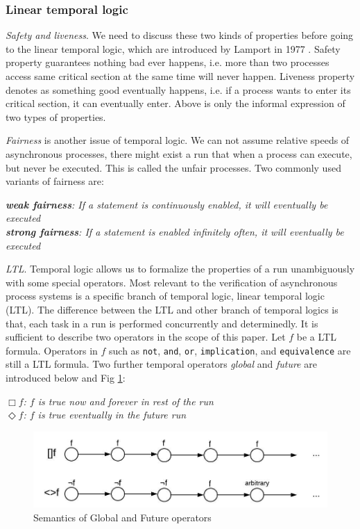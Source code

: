 \subsubsection{Linear temporal logic}
\textit{Safety and liveness}. We need to discuss these two kinds of properties before going to the linear temporal logic, which are introduced by Lamport in 1977 \cite{Lamport:1977:PCM:1313313.1313439}. Safety property guarantees nothing bad ever happens, i.e. more than two processes access same critical section at the same time will never happen. Liveness property denotes as something good eventually happens, i.e. if a process wants to enter its critical section, it can eventually enter. Above is only the informal expression of two types of properties.

\textit{Fairness} is another issue of temporal logic. We can not assume relative speeds of asynchronous processes, there might exist a run that when a process can execute, but never be executed. This is called the unfair processes. Two commonly used variants of fairness are:

{\medbreak\indent\textit{\textbf{weak fairness}: If a statement is continuously enabled, it will eventually be executed}}
{\\\indent\textit{\textbf{strong fairness}: If a statement is enabled infinitely often, it will eventually be executed}}
\medbreak

\textit{LTL}. Temporal logic allows us to formalize the properties of a run unambiguously with some special operators. Most relevant to the verification of asynchronous process systems is a specific branch of temporal logic, linear temporal logic (LTL). The difference between the LTL and other branch of temporal logics is that, each task in a run is performed concurrently and determinedly. It is sufficient to describe two operators in the scope of this paper. Let $f$ be a LTL formula. Operators in $f$ such as \texttt{not}, \texttt{and}, \texttt{or}, \texttt{implication}, and \texttt{equivalence} are still a LTL formula. Two further temporal operators \textit{global} and \textit{future} are introduced below and Fig \ref{fig:ltl}:

{\medbreak\indent\textit{$\Box f$: $f$ is true now and forever in rest of the run}}
{\\\indent\textit{$\Diamond f$: $f$ is true eventually in the future run}}
\medbreak

\begin{figure}
\includegraphics[width=0.9\linewidth]{ltl}
\caption{Semantics of Global and Future operators}
\label{fig:ltl}
\end{figure}

